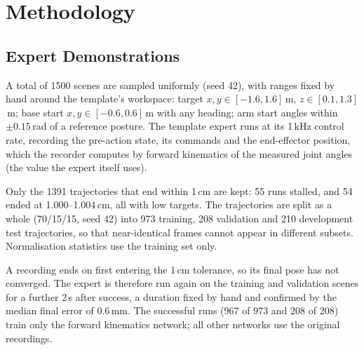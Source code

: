 \documentclass[conference]{IEEEtran}
\begin{document}
\section{Methodology}

\subsection{Expert Demonstrations}
A total of 1500 scenes are sampled uniformly (seed 42), with ranges fixed by hand around the template's
workspace: target $x,y\in[-1.6,1.6]$\,m, $z\in[0.1,1.3]$\,m; base start $x,y\in[-0.6,0.6]$\,m with any heading;
arm start angles within $\pm0.15$\,rad of a reference posture. The template expert runs at its 1\,kHz control
rate, recording the pre-action state, its commands and the end-effector position, which the recorder computes
by forward kinematics of the measured joint angles (the value the expert itself uses).

Only the 1391 trajectories that end within 1\,cm are kept: 55 runs stalled, and 54 ended at
1.000--1.004\,cm, all with low targets. The trajectories are split as a whole
(70/15/15, seed 42) into 973 training, 208 validation and 210 development test trajectories, so that
near-identical frames cannot appear in different subsets. Normalisation statistics use the training set only.

A recording ends on first entering the 1\,cm tolerance, so its final pose has not converged. The expert is
therefore run again on the training and validation scenes for a further 2\,s after success, a duration fixed by
hand and confirmed by the median final error of 0.6\,mm. The successful runs (967 of 973 and 208 of 208) train
only the forward kinematics network; all other networks use the original recordings.
\end{document}
